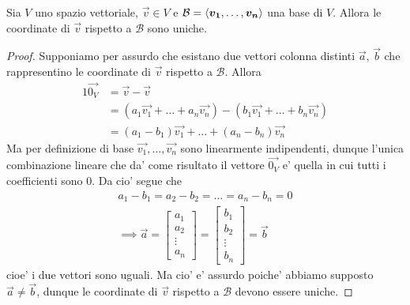 \begin{proposition}
    Sia $V$ uno spazio vettoriale, $\vec{v} \in V$ e $\mathcal{B} = \left\langle \bm{v_1}, \dots, \bm{v_n} \right\rangle$ una base di $V$. Allora le coordinate di $\vec{v}$ rispetto a $\mathcal{B}$ sono uniche.
\end{proposition}
\begin{proof}
    Supponiamo per assurdo che esistano due vettori colonna distinti $\vec{a}$, $\vec{b}$ che rappresentino le coordinate di $\vec{v}$ rispetto a $\mathcal{B}$. Allora
    \begin{alignat*}
        {1}
        \vec{0_V}  &= \vec{v} - \vec{v} \\
                &= (a_1\vec{v_1} + \dots + a_n\vec{v_n}) - (b_1\vec{v_1} + \dots + b_n\vec{v_n}) \\
                &= (a_1 - b_1)\vec{v_1} + \dots + (a_n - b_n)\vec{v_n}
    \end{alignat*}
    Ma per definizione di base $\vec{v_1}, \dots, \vec{v_n}$ sono linearmente indipendenti, dunque l'unica combinazione lineare che da' come risultato il vettore $\vec{0_V}$ e' quella in cui tutti i coefficienti sono $0$. Da cio' segue che
    \begin{gather*}
        a_1 - b_1 = a_2 - b_2 = \dots = a_n - b_n = 0 \\
        \implies \vec{a} = \begin{bmatrix}
            a_1 \\
            a_2 \\
            \vdots \\
            a_n
        \end{bmatrix}
        = 
        \begin{bmatrix}
            b_1 \\
            b_2 \\
            \vdots \\
            b_n
        \end{bmatrix} = \vec{b}
    \end{gather*}
    cioe' i due vettori sono uguali. Ma cio' e' assurdo poiche' abbiamo supposto $\vec{a} \neq \vec{b}$, dunque le coordinate di $\vec{v}$ rispetto a $\mathcal{B}$ devono essere uniche.
\end{proof}

